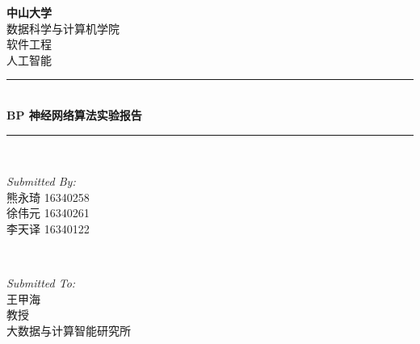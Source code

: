 \begin{titlepage}

\newcommand{\HRule}{\rule{\linewidth}{0.5mm}} %

\center %
 

\textsc{\LARGE \bfseries 中山大学 }\\[0.3cm] %
\textsc{\Large 数据科学与计算机学院}\\[0.5cm] %
\textsc{\Large 软件工程}\\[0.3cm] %
\textsc{\Large 人工智能}\\[0.5cm]


\HRule \\[0.4cm]
{ \huge \bfseries BP 神经网络算法实验报告}\\[0.03cm] %
\HRule \\[1.5cm]

 

\begin{minipage}{0.4\textwidth}
\begin{flushleft} \large
\emph{Submitted By:}\\
熊永琦 16340258\\
徐伟元 16340261\\
李天译 16340122
\end{flushleft}
\end{minipage}
~
\begin{minipage}{0.5\textwidth}
\begin{flushright} \large
\emph{Submitted To:} \\
王甲海\\ 教授\\ 大数据与计算智能研究所 %
\end{flushright}
\end{minipage}\\[1cm]


\end{titlepage}

